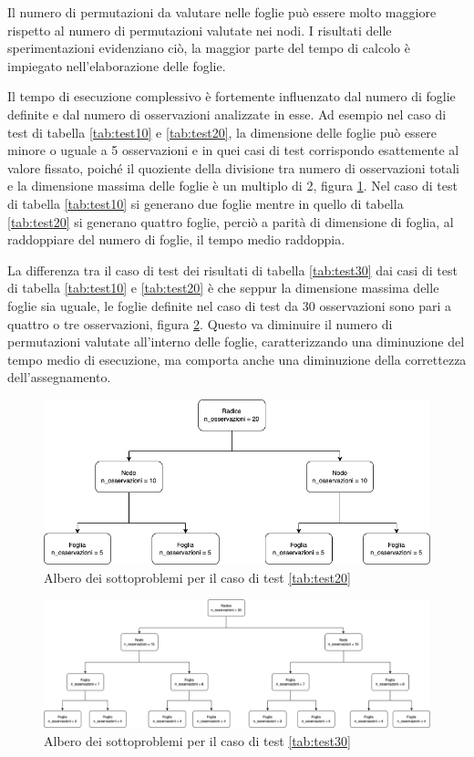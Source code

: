 \documentclass[a4paper,12pt]{report}
\begin{document}
Il numero di permutazioni da valutare nelle foglie può essere molto maggiore rispetto al numero di permutazioni valutate nei nodi.
I risultati delle sperimentazioni evidenziano ciò, la maggior parte del tempo di calcolo è impiegato nell'elaborazione delle foglie.

Il tempo di esecuzione complessivo è fortemente influenzato dal numero di foglie definite e dal numero di osservazioni analizzate in esse. Ad esempio nel caso di test di tabella \ref{tab:test10} e \ref{tab:test20}, la dimensione delle foglie può essere minore o uguale a 5 osservazioni e in quei casi di test corrispondo esattemente al valore fissato, poiché il quoziente della divisione tra numero di osservazioni totali e la dimensione massima delle foglie è un multiplo di 2, figura \ref{fig:alberoTest20}. Nel caso di test di tabella \ref{tab:test10} si generano due foglie mentre in quello di tabella \ref{tab:test20} si generano quattro foglie, perciò a parità di dimensione di foglia, al raddoppiare del numero di foglie, il tempo medio raddoppia.

La differenza tra il caso di test dei risultati di tabella \ref{tab:test30} dai casi di test di tabella \ref{tab:test10} e \ref{tab:test20} è che seppur la dimensione massima delle foglie sia uguale, le foglie definite nel caso di test da 30 osservazioni sono pari a quattro o tre osservazioni, figura \ref{fig:alberoTest30}. Questo va diminuire il numero di permutazioni valutate all'interno delle foglie, caratterizzando una diminuzione del tempo medio di esecuzione, ma comporta anche una diminuzione della correttezza dell'assegnamento.


\begin{figure}[H]
  \centering
  \includegraphics[scale=0.50]{img/utility/alberoTest20.png}
  \caption{Albero dei sottoproblemi per il caso di test \ref{tab:test20}}
  \label{fig:alberoTest20}
\end{figure}

\begin{figure}[H]
  \centering
  \includegraphics[scale=0.5,angle=90,origin=c]{img/utility/alberoTest30.png}
  \caption{Albero dei sottoproblemi per il caso di test \ref{tab:test30}}
  \label{fig:alberoTest30}
\end{figure}
\end{document}
